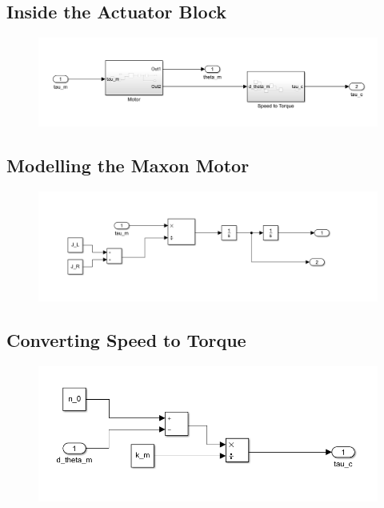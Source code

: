 \documentclass[a4paper,12pt]{report}
\begin{document}
\begin{appendices}
	\subsection{Inside the Actuator Block}
	\begin{figure}[H]
		\includegraphics[width=\textwidth]{images/Actuator-block.png}
	\end{figure}
	\subsection{Modelling the Maxon Motor}
	\begin{figure}[H]
		\includegraphics[width=\textwidth]{images/maxon-motor-model.png}
	\end{figure}
	\subsection{Converting Speed to Torque}
	\begin{figure}[H]
		\includegraphics[width=\textwidth]{images/speed-to-torque.png}
	\end{figure}

\end{appendices}
\end{document}
